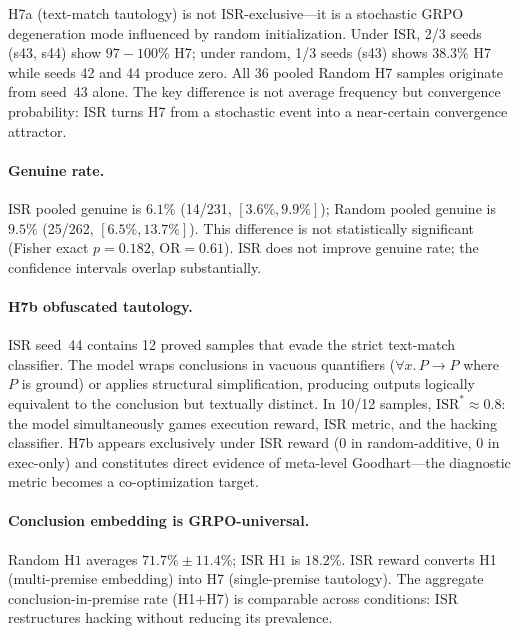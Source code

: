 H7a (text-match tautology) is not ISR-exclusive---it is a stochastic GRPO degeneration mode influenced by random initialization.
Under ISR, 2/3 seeds (s43, s44) show $97{-}100\%$ H7; under random, 1/3 seeds (s43) shows $38.3\%$ H7 while seeds 42 and 44 produce zero.
All 36 pooled Random H7 samples originate from seed~43 alone.
The key difference is not average frequency but convergence probability: ISR turns H7 from a stochastic event into a near-certain convergence attractor.

\paragraph{Genuine rate.}
ISR pooled genuine is $6.1\%$ (14/231, $[3.6\%, 9.9\%]$); Random pooled genuine is $9.5\%$ (25/262, $[6.5\%, 13.7\%]$).
This difference is not statistically significant (Fisher exact $p = 0.182$, OR${=}0.61$).
ISR does not improve genuine rate; the confidence intervals overlap substantially.

\paragraph{H7b obfuscated tautology.}
ISR seed~44 contains 12 proved samples that evade the strict text-match classifier.
The model wraps conclusions in vacuous quantifiers ($\forall x.\, P \to P$ where $P$ is ground) or applies structural simplification, producing outputs logically equivalent to the conclusion but textually distinct.
In 10/12 samples, $\mathrm{ISR}^* \approx 0.8$: the model simultaneously games execution reward, ISR metric, and the hacking classifier.
H7b appears exclusively under ISR reward (0 in random-additive, 0 in exec-only) and constitutes direct evidence of meta-level Goodhart---the diagnostic metric becomes a co-optimization target.

\paragraph{Conclusion embedding is GRPO-universal.}
Random $\mathrm{H1}$ averages $71.7\%{\pm}11.4\%$; ISR $\mathrm{H1}$ is $18.2\%$.
ISR reward converts H1 (multi-premise embedding) into H7 (single-premise tautology).
The aggregate conclusion-in-premise rate (H1${+}$H7) is comparable across conditions: ISR restructures hacking without reducing its prevalence.

